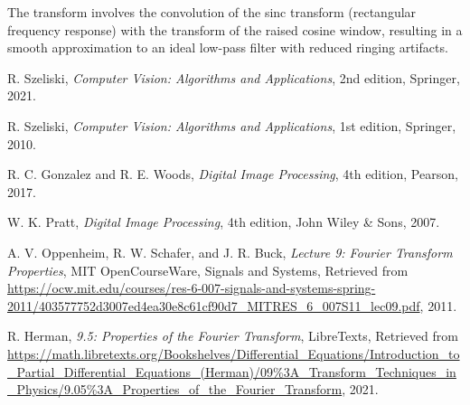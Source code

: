 \documentclass[12pt,a4paper]{article}
\begin{document}
The transform involves the convolution of the sinc transform (rectangular frequency response) with the transform of the raised cosine window, resulting in a smooth approximation to an ideal low-pass filter with reduced ringing artifacts.


\begin{thebibliography}{20}

R. Szeliski, \emph{Computer Vision: Algorithms and Applications}, 2nd edition, Springer, 2021.

R. Szeliski, \emph{Computer Vision: Algorithms and Applications}, 1st edition, Springer, 2010.

R. C. Gonzalez and R. E. Woods, \emph{Digital Image Processing}, 4th edition, Pearson, 2017.

W. K. Pratt, \emph{Digital Image Processing}, 4th edition, John Wiley \& Sons, 2007.

A. V. Oppenheim, R. W. Schafer, and J. R. Buck, \emph{Lecture 9: Fourier Transform Properties}, MIT OpenCourseWare, Signals and Systems, Retrieved from \url{https://ocw.mit.edu/courses/res-6-007-signals-and-systems-spring-2011/403577752d3007ed4ea30e8c61cf90d7_MITRES_6_007S11_lec09.pdf}, 2011. 

R. Herman, \emph{9.5: Properties of the Fourier Transform}, LibreTexts, Retrieved from \url{https://math.libretexts.org/Bookshelves/Differential_Equations/Introduction_to_Partial_Differential_Equations_(Herman)/09%3A_Transform_Techniques_in_Physics/9.05%3A_Properties_of_the_Fourier_Transform}, 2021. 
\end{thebibliography}
\end{document}
